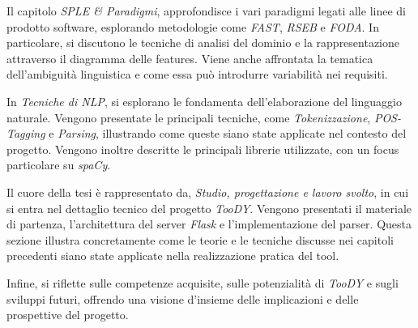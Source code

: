 \documentclass[12pt]{report}
\newcommand{\toody}{\textsl{TooDY}\xspace}
\newcommand{\flask}{\textsl{Flask}\xspace}
\newcommand{\spacy}{\textsl{spaCy}\xspace}
\begin{document}
Il capitolo \textsl{SPLE \& Paradigmi}, approfondisce i vari paradigmi legati alle linee di prodotto software, esplorando metodologie come \textit{FAST}, \textit{RSEB} e \textit{FODA}. In particolare, si discutono le tecniche di analisi del dominio e la rappresentazione attraverso il diagramma delle features. Viene anche affrontata la tematica dell’ambiguità linguistica e come essa può introdurre variabilità nei requisiti.

In \textsl{Tecniche di NLP}, si esplorano le fondamenta dell'elaborazione del linguaggio naturale. Vengono presentate le principali tecniche, come \textit{Tokenizzazione}, \textit{POS-Tagging} e \textit{Parsing}, illustrando come queste siano state applicate nel contesto del progetto. Vengono inoltre descritte le principali librerie utilizzate, con un focus particolare su \spacy.

Il cuore della tesi è rappresentato da, \textsl{Studio, progettazione e lavoro svolto}, in cui si entra nel dettaglio tecnico del progetto \toody. Vengono presentati il materiale di partenza, l'architettura del server \flask e l’implementazione del parser. Questa sezione illustra concretamente come le teorie e le tecniche discusse nei capitoli precedenti siano state applicate nella realizzazione pratica del tool.

Infine, si riflette sulle competenze acquisite, sulle potenzialità di \toody e sugli sviluppi futuri, offrendo una visione d'insieme delle implicazioni e delle prospettive del progetto.

\end{document}

